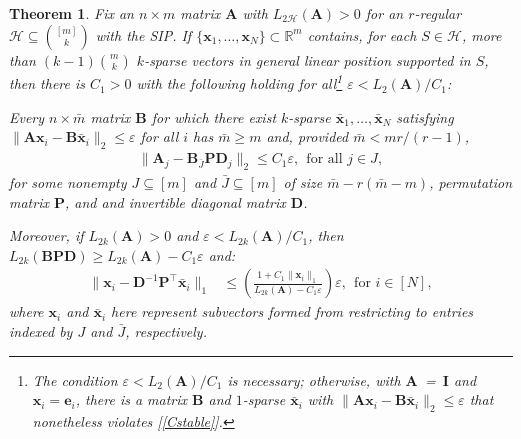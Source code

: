 \documentclass[9pt,twocolumn]{pnas-new}
\newtheorem{theorem}{Theorem}
\renewcommand{\eqref}[1]{\textnormal{[\ref{#1}]}}
\begin{document}
\begin{theorem}\label{DeterministicUniquenessTheorem}
Fix an $n \times m$ matrix $\mathbf{A}$ with $L_{2\mathcal{H}}(\mathbf{A}) > 0$ for an $r$-regular $\mathcal{H} \subseteq {[m] \choose k}$ with the SIP. If \mbox{$\{\mathbf{x}_1, \ldots, \mathbf{x}_N\} \subset \mathbb{R}^m$} contains, for each $S \in \mathcal{H}$, more than $(k-1){m \choose k}$ $k$-sparse vectors in general linear position supported in $S$, then there is $C_1 > 0$ with the following holding for all\footnote{The condition $\varepsilon < L_2(\mathbf{A}) /C_1$ is necessary; otherwise,  with \mbox{$\mathbf{A}$ = $\mathbf{I}$} and $\mathbf{x}_i = \mathbf{e}_i$, there is a matrix $\mathbf{B}$ and $1$-sparse $\mathbf{\bar{x}}_i$ with $\|\mathbf{A}\mathbf{x}_i - \mathbf{B}\mathbf{\bar{x}}_i \|_2 \leq \varepsilon$ that nonetheless violates \eqref{Cstable}.} $\varepsilon < L_{2}(\mathbf{A}) / C_1$:

Every $n \times \bar m$ matrix $\mathbf{B}$ for which there exist $k$-sparse $\mathbf{\bar x}_1, \ldots, \mathbf{\bar x}_N$ satisfying \mbox{$\|\mathbf{A}\mathbf{x}_i - \mathbf{B}\mathbf{\bar x}_i\|_2 \leq \varepsilon$} for all $i$ has $\bar m \geq m$ and, provided $\bar m < mr/(r-1)$,
\begin{align}\label{Cstable}
\|\mathbf{A}_j- \mathbf{B}_{\bar J} \mathbf{PD}_j\|_2 \leq C_1 \varepsilon, \ \ \text{for all } j \in J,
\end{align}
%
for some nonempty $J \subseteq [m]$ and $\bar J \subseteq [m]$ of size $\bar m - r(\bar m - m)$, permutation matrix $\mathbf{P}$, and and invertible diagonal matrix $\mathbf{D}$. 

Moreover, if $L_{2k}(\mathbf{A}) > 0$ and $\varepsilon < L_{2k}(\mathbf{A}) / C_1$, then $L_{2k}(\mathbf{B}\mathbf{PD}) \geq L_{2k}(\mathbf{A}) - C_1 \varepsilon$ and:
\begin{align}\label{b-PDa}
\|\mathbf{x}_i - \mathbf{D}^{-1}\mathbf{P}^{\top}\mathbf{\bar x}_i\|_1 &\leq  \left( \frac{ 1+C_1 \|\mathbf{x}_i\|_1 }{ L_{2k}(\mathbf{A}) -  C_1\varepsilon } \right) \varepsilon, \ \  \text{for $i \in [N]$},
\end{align}
%
where $\mathbf{x}_i$ and $\mathbf{\bar x}_i$ here represent subvectors formed from restricting to entries indexed by $J$ and $\bar J$, respectively. 
\end{theorem}
\end{document}
